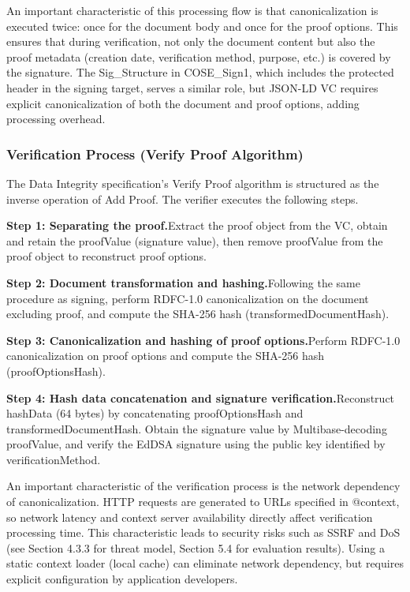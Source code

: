 \documentclass[conference]{IEEEtran}
\begin{document}
An important characteristic of this processing flow is that canonicalization is executed twice: once for the document body and once for the proof options. This ensures that during verification, not only the document content but also the proof metadata (creation date, verification method, purpose, etc.) is covered by the signature. The Sig\_Structure in COSE\_Sign1, which includes the protected header in the signing target, serves a similar role, but JSON-LD VC requires explicit canonicalization of both the document and proof options, adding processing overhead.

\subsubsection{Verification Process (Verify Proof Algorithm)}

The Data Integrity specification's Verify Proof algorithm is structured as the inverse operation of Add Proof. The verifier executes the following steps.

\textbf{Step 1: Separating the proof.}Extract the proof object from the VC, obtain and retain the proofValue (signature value), then remove proofValue from the proof object to reconstruct proof options.

\textbf{Step 2: Document transformation and hashing.}Following the same procedure as signing, perform RDFC-1.0 canonicalization on the document excluding proof, and compute the SHA-256 hash (transformedDocumentHash).

\textbf{Step 3: Canonicalization and hashing of proof options.}Perform RDFC-1.0 canonicalization on proof options and compute the SHA-256 hash (proofOptionsHash).

\textbf{Step 4: Hash data concatenation and signature verification.}Reconstruct hashData (64 bytes) by concatenating proofOptionsHash and transformedDocumentHash. Obtain the signature value by Multibase-decoding proofValue, and verify the EdDSA signature using the public key identified by verificationMethod.

An important characteristic of the verification process is the network dependency of canonicalization. HTTP requests are generated to URLs specified in @context, so network latency and context server availability directly affect verification processing time. This characteristic leads to security risks such as SSRF and DoS (see Section 4.3.3 for threat model, Section 5.4 for evaluation results). Using a static context loader (local cache) can eliminate network dependency, but requires explicit configuration by application developers.
\end{document}
